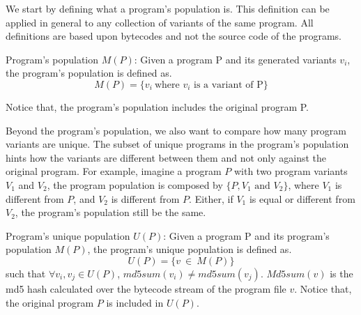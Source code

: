 We start by defining what a program's population is. This definition can be applied in general to any collection of variants of the same program. All definitions are based upon bytecodes and not the source code of the programs.

\begin{definition}{Program's population $M(P)$:}\label{def:rq1:programspopulation}
    \normalfont 
    Given a program P and its generated variants $v_i$, the program's population is defined as.\\
    $$
        M(P)=\{v_i\ \text{where $v_i$ is a variant of P}\}
    $$

    Notice that, the program's population includes the original program P.
\end{definition}

Beyond the program's population, we also want to compare how many program variants are unique. The subset of unique programs in the program's population hints how the variants are different between them and not only against the original program. For example, imagine a program $P$ with two program variants $V_1$ and $V_2$, the program population is composed by $\{P, V_1 \text{ and } V_2\}$, where $V_1$ is different from $P$, and $V_2$ is different from $P$. Either, if $V_1$ is equal or different from $V_2$, the program's population still be the same.






\begin{definition}{Program's unique population $U(P)$:}\label{def:rq1:programsuniquepopulation}
    \normalfont 
    Given a program P and its program's population $M(P)$, the program's unique population is defined as.\\
    $$
        U(P)=\{v\ \in\ M(P)\}
    $$
    such that $\forall v_i,v_j \in U(P)$, $md5sum(v_i) \neq md5sum(v_j)$.
    $Md5sum(v)$ is the md5 hash calculated over the bytecode stream of the program file $v$. Notice that, the original program $P$ is included in $U(P)$.

\end{definition}

